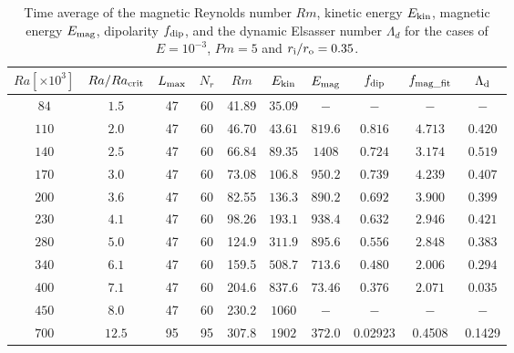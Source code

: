 \begin{table}
\begin{center}
\caption{Time average of the magnetic Reynolds number $Rm$, kinetic energy $E_{\rm kin}$, magnetic energy $E_{\rm mag}$, dipolarity $f_{\rm dip}$, and the dynamic Elsasser number $\Lambda_{d}$ for the cases of $E = 10^{-3}$, $Pm = 5$ and $r_{\rm i}/r_{\rm o} = 0.35$.}
\label{table:Summary_35}
  \begin{tabular}{cccccccccc}
    \hline
     $Ra[\times 10^3]$  &  $Ra/Ra_{\rm crit}$& 
     {\color{black} $L_{\rm max}$} & {\color{black} $N_{r}$} & {\color{black} $Rm$} & $E_{\rm kin}$  &  $E_{\rm mag}$ & $f_{\rm dip}$ & $f_{\rm mag\_fit}$ & $\Lambda_{\rm d}$\\
    \hline
      $84$  & $1.5$ & 47 & 60 & 41.89 &   $35.09$ & $-$ & $-$ & $-$ & $-$ \\
     $110$  & $2.0$ & 47 & 60 & 46.70 &  $43.61$ & $819.6$ & $0.816$ & $4.713$& $0.420$\\
     $140$  & $2.5$ & 47 & 60 & 66.84 &  $89.35$ & $1408$ & $0.724$ & $3.174$ & $0.519$\\
     $170$  & $3.0$ & 47 & 60 & 73.08 &  $106.8$ & $950.2$ & $0.739$ & $4.239$ & $0.407$\\
     $200$  & $3.6$ & 47 & 60 & 82.55 &  $136.3$ & $890.2$ & $0.692$ & $3.900$ & $0.399$\\
     $230$  & $4.1$ & 47 & 60 & 98.26 &  $193.1$ & $938.4$ & $0.632$ & $2.946$ & $0.421$\\
     $280$  & $5.0$ & 47 & 60 & 124.9 &  $311.9$ & $895.6$ & $0.556$ & $2.848$ & $0.383$\\
     $340$  & $6.1$ & 47 & 60 & 159.5 &  $508.7$ & $713.6$ & $0.480$ & $2.006$ & $0.294$\\
     $400$  & $7.1$ & 47 & 60 & 204.6 &  $837.6$ & $73.46$ & $0.376$ & $2.071$ & $0.035$\\
     $450$  & $8.0$ & 47 & 60 & 230.2 &  $1060$ & $-$ & $-$ & $-$ & $-$ \\
     $700$  & $12.5$ & 95 & 95 & 307.8 & $1902$ & $372.0$ & 0.02923 & 0.4508 & 0.1429 \\
    \hline
  \end{tabular}
\end{center}
 \end{table}